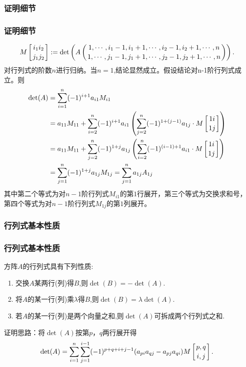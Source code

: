 \subsubsection{证明细节}
\begin{frame}\frametitle{证明细节}
\[ M\left[{{i_1i_2}\atop {j_1j_2}}\right]:=\det\left(A\left({1,\cdots,i_1-1,i_1+1,\cdots,i_2-1,i_2+1,\cdots,n} \atop {1,\cdots,j_1-1,j_1+1,\cdots,j_2-1,j_2+1,\cdots,n}\right)\right).\]
\pp
对行列式的阶数$n$进行归纳。当$n=1$,结论显然成立。假设结论对n-1阶行列式成立。\pp 则
\begin{equation*}
\begin{split}
\det(A)
& = \sum_{i=1}^{n}(-1)^{i+1}a_{i1}M_{i1} \\ 
& = a_{11}M_{11} + \sum_{i=2}^{n}(-1)^{i+1}a_{i1} \left(\sum_{j=2}^{n} (-1)^{1+(j-1)} a_{1j}\cdot M\left[{1i}\atop{1j}\right]\right)\\ 
& = a_{11}M_{11} + \sum_{j=2}^{n}(-1)^{1+j} a_{1j} \left(\sum_{i=2}^{n} (-1)^{(i-1)+1} a_{i1}\cdot M\left[{1i}\atop{1j}\right]\right)\\ 
& = \sum_{j=1}^{n} (-1)^{1+j}a_{1j} M_{1j}   = \sum_{j=1}^{n} a_{1j}A_{1j} \\ 
\end{split}
\end{equation*}
\pp
其中第二个等式为对$n-1$阶行列式$M_{i1}$的第$1$行展开，第三个等式为交换求和号，第四个等式为对$n-1$阶行列式$M_{1j}$的第$1$列展开。
\end{frame}



\renewcommand{\mydate}{2025年03月20号\quad 第八次课}



\subsubsection{行列式基本性质}
\begin{frame}\frametitle{行列式基本性质}
\begin{theorem}
方阵$A$的行列式具有下列性质:
\begin{enumerate}
\item 交换$A$某两行(列)得$B$,则$\det(B)=-\det(A)$.\pp
\item 将$A$的某一行(列)乘$\lambda$得$B$,则$\det(B)=\lambda\det(A)$. \pp
\item 若$A$的某一行(列)是两个向量之和,则$\det(A)$可拆成两个行列式之和. \pp
\end{enumerate}
\end{theorem}
证明思路：将$\det(A)$按第$p，q$两行展开得
\[\det(A) = \sum_{i=1}^n \sum_{j=1}^{i-1} (-1)^{p+q+i+j-1}(a_{pi}a_{qj}-a_{pj}a_{qi}) M\left[{p,q}\atop{i,j}\right].\]

\pp

\end{frame}










